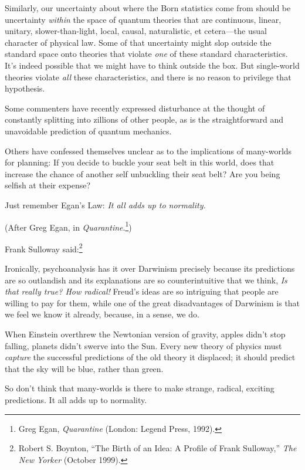 {
 Similarly, our uncertainty about where the Born statistics come
from should be uncertainty \textit{within} the space of quantum
theories that are continuous, linear, unitary, slower-than-light,
local, causal, naturalistic, et cetera---the usual character of
physical law. Some of that uncertainty might slop outside the standard
space onto theories that violate \textit{one} of these standard
characteristics. It's indeed possible that we might
have to think outside the box. But single-world theories violate
\textit{all} these characteristics, and there is no reason to privilege
that hypothesis.}

\myendsectiontext


{
 Some commenters have recently expressed disturbance at the thought
of constantly splitting into zillions of other people, as is the
straightforward and unavoidable prediction of quantum mechanics. }

{
 Others have confessed themselves unclear as to the implications of
many-worlds for planning: If you decide to buckle your seat belt in
this world, does that increase the chance of another self unbuckling
their seat belt? Are you being selfish at their expense?}

{
 Just remember Egan's Law: \textit{It all adds up
to normality.}}

{
 (After Greg Egan, in \textit{Quarantine}.\footnote{Greg Egan, \textit{Quarantine} (London: Legend Press, 1992).})}

{
 Frank Sulloway said:\footnote{Robert S. Boynton, ``The Birth of an Idea: A
Profile of Frank Sulloway,'' \textit{The New Yorker}
(October 1999).}}

{
 Ironically, psychoanalysis has it over Darwinism precisely because
its predictions are so outlandish and its explanations are so
counterintuitive that we think, \textit{Is that really true? How
radical!} Freud's ideas are so intriguing that people
are willing to pay for them, while one of the great disadvantages of
Darwinism is that we feel we know it already, because, in a sense, we
do.}

{
 When Einstein overthrew the Newtonian version of gravity, apples
didn't stop falling, planets didn't
swerve into the Sun. Every new theory of physics must \textit{capture}
the successful predictions of the old theory it displaced; it should
predict that the sky will be blue, rather than green.}

{
 So don't think that many-worlds is there to make
strange, radical, exciting predictions. It all adds up to normality.}

